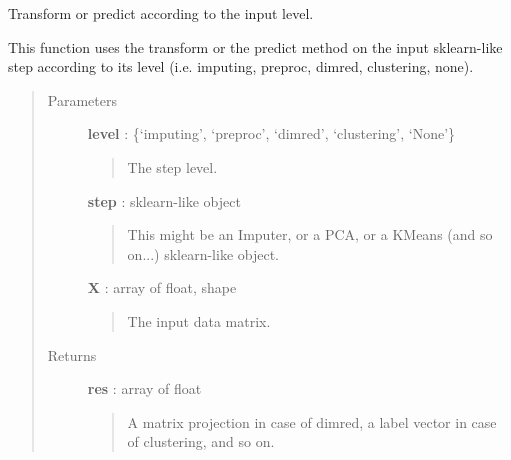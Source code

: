 \documentclass[letterpaper,10pt,english]{sphinxmanual}
\begin{document}
\begin{fulllineitems}
\label{index:adenine.core.pipelines.evaluate}
Transform or predict according to the input level.

This function uses the transform or the predict method on the input
sklearn-like step according to its level (i.e. imputing, preproc, dimred,
clustering, none).
\begin{quote}\begin{description}
\item[{Parameters}] \leavevmode
\textbf{level} : \{`imputing', `preproc', `dimred', `clustering', `None'\}
\begin{quote}

The step level.
\end{quote}

\textbf{step} : sklearn-like object
\begin{quote}

This might be an Imputer, or a PCA, or a KMeans (and so on...)
sklearn-like object.
\end{quote}

\textbf{X} : array of float, shape
\begin{quote}

The input data matrix.
\end{quote}

\item[{Returns}] \leavevmode
\textbf{res} : array of float
\begin{quote}

A matrix projection in case of dimred, a label vector in case of
clustering, and so on.
\end{quote}

\end{description}\end{quote}

\end{fulllineitems}

\end{document}
